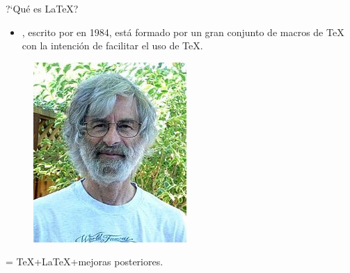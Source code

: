 \documentclass{beamer}
\begin{document}
\begin{frame}
  \frametitle{}
  
  \begin{block}{?`Qu\'e es \LaTeX?}
    \begin{itemize}
    \item \structure{\LaTeX}, escrito por  en 1984,
      est\'a formado por un gran conjunto de macros de \TeX\, con la intenci\'on
      de facilitar el uso de \TeX.
    \end{itemize}
  \end{block}
  
  \vspace{-10px}
  
  \begin{figure}
    \centering
    \includegraphics[scale=0.6]{img/Leslie_Lamport.jpg}
    
  \end{figure}

  \pause

  \vspace{-15px}

  \begin{alertblock}{}
    \hspace{60px}
    \structure{\LaTeX}
    \hspace{10px}=\hspace{10px}
    \TeX+\LaTeX+mejoras posteriores.
  \end{alertblock}

\end{frame}

\end{document}
